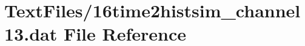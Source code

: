 \hypertarget{16time2histsim__channel13_8dat}{}\section{Text\+Files/16time2histsim\+\_\+channel13.dat File Reference}
\label{16time2histsim__channel13_8dat}
